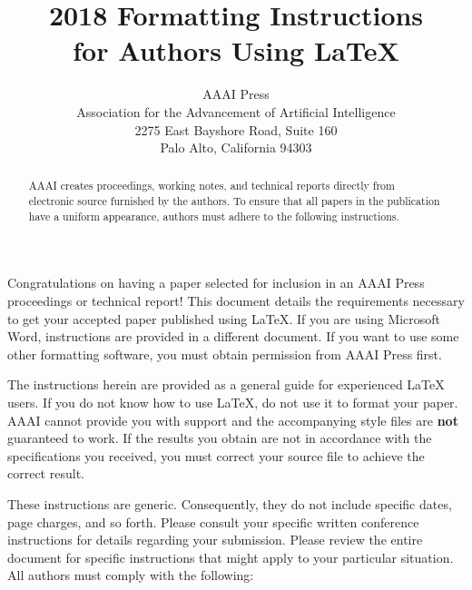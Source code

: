 \documentclass[letterpaper]{article} %
\begin{document}
%
\title{2018 Formatting Instructions \\for Authors Using \LaTeX{}}
\author{AAAI Press\\
Association for the Advancement of Artificial Intelligence\\
2275 East Bayshore Road, Suite 160\\
Palo Alto, California 94303\\
}
\maketitle
\begin{abstract}
AAAI creates proceedings, working notes, and technical reports directly from electronic source furnished by the authors. To ensure that all papers in the publication have a uniform appearance, authors must adhere to the following instructions. 
\end{abstract}

\noindent Congratulations on having a paper selected for inclusion in an AAAI Press proceedings or technical report! This document details the requirements necessary to get your accepted paper published using \LaTeX{}. If you are using Microsoft Word, instructions are provided in a different document. If you want to use some other formatting software, you must obtain permission from AAAI Press first. 

The instructions herein are provided as a general guide for experienced \LaTeX{} users. If you do not know how to use \LaTeX{}, do not use it to format your paper. AAAI cannot provide you with support and the accompanying style files are \textbf{not} guaranteed to work. If the results you obtain are not in accordance with the specifications you received, you must correct your source file to achieve the correct result. 

These instructions are generic. Consequently, they do not include specific dates, page charges, and so forth. Please consult your specific written conference instructions for details regarding your submission. Please review the entire document for specific instructions that might apply to your particular situation. All authors must comply with the following:
\end{document}
